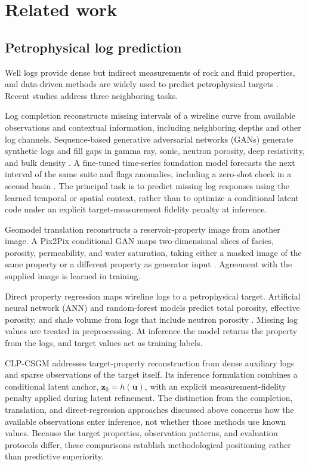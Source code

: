 \section{Related work}
\label{sec:related_work}

\subsection{Petrophysical log prediction}

Well logs provide dense but indirect measurements of rock and fluid properties,
and data-driven methods are widely used to predict petrophysical targets
\citep{ellis2007well,asquith2004basic,ahmadi2019comparison,wood2020predicting}.
Recent studies address three neighboring tasks.

Log completion reconstructs missing intervals of a wireline curve from available
observations and contextual information, including neighboring depths and other
log channels. Sequence-based generative adversarial networks (GANs) generate
synthetic logs and fill gaps in
gamma ray, sonic, neutron porosity, deep resistivity, and bulk density
\citep{alfakih2025wellloggan}. A fine-tuned time-series foundation model
forecasts the next interval of the same suite and flags anomalies, including a
zero-shot check in a second basin \citep{koeshidayatullah2026timegpt}. The
principal task is to predict missing log responses using the learned temporal
or spatial context, rather than to optimize a conditional latent code under an
explicit target-measurement fidelity penalty at inference.

Geomodel translation reconstructs a reservoir-property image from another
image. A Pix2Pix conditional GAN maps two-dimensional slices of facies,
porosity, permeability, and water saturation, taking either a masked image of
the same property or a different property as generator input
\citep{alfakih2026pix2geomodel}. Agreement with the supplied image is learned
in training.

Direct property regression maps wireline logs to a petrophysical target.
Artificial neural network (ANN) and random-forest models predict total
porosity, effective porosity, and shale
volume from logs that include neutron porosity \citep{alfakih2023northsea}.
Missing log values are treated in preprocessing. At inference the model returns
the property from the logs, and target values act as training labels.

CLP-CSGM addresses target-property reconstruction from dense auxiliary logs
and sparse observations of the target itself. Its inference formulation
combines a conditional latent anchor, $\boldsymbol{z}_0=h(\boldsymbol{u})$,
with an explicit measurement-fidelity penalty applied during latent
refinement. The distinction from the completion, translation, and
direct-regression approaches discussed above concerns how the available
observations enter inference, not whether those methods use known values.
Because the target properties, observation patterns, and evaluation protocols
differ, these comparisons establish methodological positioning rather than
predictive superiority.

